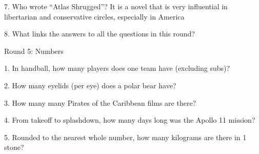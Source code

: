 \begin{frame}
\begin{center}
\Large
7. Who wrote ``Atlas Shrugged''? It is a novel that is very influential in libertarian and conservative circles, especially in America
\\
\end{center}
\end{frame}
\begin{frame}
\begin{center}
\Large
8. What links the answers to all the questions in this round?
\\
\end{center}
\end{frame}
\begin{frame}
\begin{center}
\Huge
Round 5: Numbers
\end{center}
\end{frame}
\begin{frame}
\begin{center}
\Large
1. In handball, how many players does one team have (excluding subs)?
\end{center}
\end{frame}
\begin{frame}
\begin{center}
\Large
2. How many eyelids (per eye) does a polar bear have?
\end{center}
\end{frame}
\begin{frame}
\begin{center}
\Large
3. How many many Pirates of the Caribbean films are there?
\end{center}
\end{frame}
\begin{frame}
\begin{center}
\Large
4. From takeoff to splashdown, how many days long was the Apollo 11 mission?
\end{center}
\end{frame}
\begin{frame}
\begin{center}
\Large
5. Rounded to the nearest whole number, how many kilograms are there in 1 stone?
\end{center}
\end{frame}
